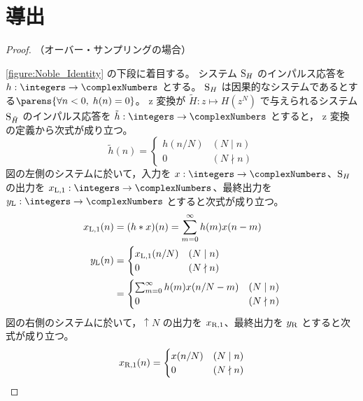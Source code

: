     \section{導出}
        \begin{proof}
            \quad\par\noindent
            （オーバー・サンプリングの場合）
            \par\noindent
            \cref{figure:Noble_Identity} の下段に着目する。
            システム $\mathrm{S}_H$ のインパルス応答を $h:\integers\to\complexNumbers$ とする。
            $\mathrm{S}_H$ は因果的なシステムであるとする$\parens{\forall n<0,\;h(n)=0}$。
            z 変換が $\tilde{H}:z\mapsto H(z^N)$ で与えられるシステム $\mathrm{S}_{\tilde{H}}$ のインパルス応答を $\tilde{h}:\integers\to\complexNumbers$ とすると， z 変換の定義から次式が成り立つ。
            \[
                \tilde{h}(n) = \begin{cases}
                    h(n/N) & (N\mid n) \\
                    0 & (N\nmid n)
                \end{cases} \tag{1}
            \]
            図の左側のシステムに於いて，入力を $x:\integers\to\complexNumbers$、$\mathrm{S}_H$ の出力を $\xLone:\integers\to\complexNumbers$、最終出力を $\yL:\integers\to\complexNumbers$ とすると次式が成り立つ。
            \begin{align*}
                x_{\mathrm{L},1}(n) &= (h*x)(n) = \sum_{m=0}^\infty h(m)x(n-m) \\
                y_{\mathrm{L}}(n) &= \begin{cases}
                    x_{\mathrm{L},1}(n/N) & (N\mid n) \\
                    0 & (N\nmid n)
                \end{cases} \\
                &= \begin{cases}
                    \sum_{m=0}^\infty h(m)x(n/N-m) & (N\mid n) \\
                    0 & (N\nmid n)
                \end{cases}
            \end{align*}
            図の右側のシステムに於いて，$\uparrow N$ の出力を $x_{\mathrm{R},1}$、最終出力を $y_{\mathrm{R}}$ とすると次式が成り立つ。
            \begin{align*}
                \xRone(n) &= \begin{cases}
                    x(n/N) & (N\mid n) \\
                    0 & (N\nmid n)
                \end{cases} \\

\end{align*}
\end{proof}
